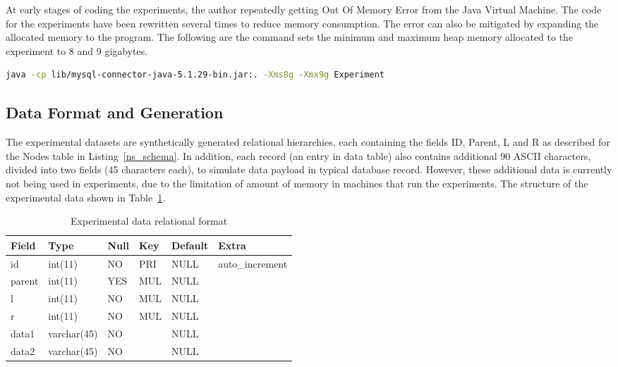 At early stages of coding the experiments, the author repeatedly getting Out Of Memory Error from the Java Virtual Machine. The code for the experiments have been rewritten several times to reduce memory consumption. The error can also be mitigated by expanding the allocated memory to the program. The following are the command sets the minimum and maximum heap memory allocated to the experiment to 8 and 9 gigabytes.

\begin{lstlisting}[language=bash,caption={Nodes table for nested set model},label=run_client]
java -cp lib/mysql-connector-java-5.1.29-bin.jar:. -Xms8g -Xmx9g Experiment
\end{lstlisting}

\subsection{Data Format and Generation}\label{sec_experimental_data}

The experimental datasets are synthetically generated relational hierarchies, each containing the fields ID, Parent, L and R as described for the Nodes table in Listing~\ref{ns_schema}. In addition, each record (an entry in data table) also contains additional 90 ASCII characters, divided into two fields (45 characters each), to simulate data payload in typical database record. However, these additional data is currently not being used in experiments, due to the limitation of amount of memory in machines that run the experiments. The structure of the experimental data shown in Table~\ref{tb_rel_exp_data_format}.

\begin{table}[h]
\centering
\begin{tabular}{|l|l|l|l|l|l|}
\hline
\textbf{Field} & \textbf{Type} & \textbf{Null} & \textbf{Key} & \textbf{Default} & \textbf{Extra}  \\ \hline
id             & int(11)       & NO            & PRI          & NULL             & auto\_increment \\ \hline
parent         & int(11)       & YES           & MUL          & NULL             &                 \\ \hline
l              & int(11)       & NO            & MUL          & NULL             &                 \\ \hline
r              & int(11)       & NO            & MUL          & NULL             &                 \\ \hline
data1          & varchar(45)   & NO            &              & NULL             &                 \\ \hline
data2          & varchar(45)   & NO            &              & NULL             &                 \\ \hline
\end{tabular}
\caption{Experimental data relational format}
\label{tb_rel_exp_data_format}
\end{table}

